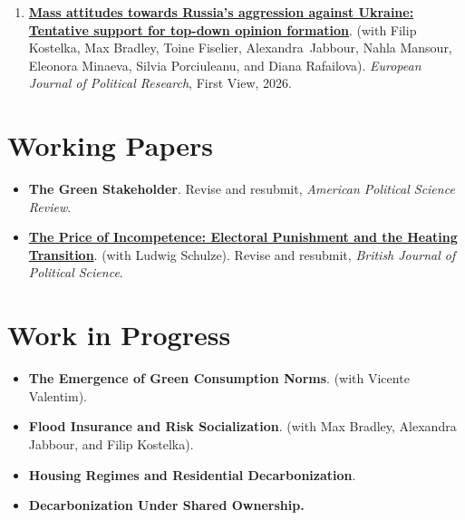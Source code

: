 \documentclass[11pt,a4paper]{article}
\begin{document}
\begin{enumerate}
  \item \href{https://doi.org/10.1017/S1475676526101352}{\textbf{Mass attitudes towards Russia's aggression against Ukraine: Tentative support for top-down opinion formation}}.
  {\color{muted}(with Filip Kostelka, Max Bradley, Toine Fiselier, \mbox{Alexandra Jabbour}, Nahla Mansour, Eleonora Minaeva, Silvia Porciuleanu, and Diana Rafailova).}
  \emph{European Journal of Political Research}, First View, 2026.
\end{enumerate}


\section{Working Papers}

\begin{itemize}
  \item \textbf{The Green Stakeholder}. {\color{muted}Revise and resubmit, \emph{American Political Science Review}.}
  \item \href{https://osf.io/preprints/socarxiv/28kfy_v1}{\textbf{The Price of Incompetence: Electoral Punishment and the Heating Transition}}.
  {\color{muted}(with Ludwig Schulze). Revise and resubmit, \emph{British Journal of Political Science}.}
\end{itemize}


\section{Work in Progress}

\begin{itemize}
  \item \textbf{The Emergence of Green Consumption Norms}.
  {\color{muted}(with Vicente Valentim).}
  \item \textbf{Flood Insurance and Risk Socialization}.
  {\color{muted}(with Max Bradley, Alexandra Jabbour, and Filip Kostelka).}
  \item \textbf{Housing Regimes and Residential Decarbonization}.
  \item \textbf{Decarbonization Under Shared Ownership.}
\end{itemize}
\end{document}
